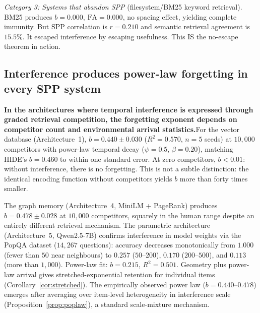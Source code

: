 \documentclass[11pt]{article}
\begin{document}
\textit{Category 3: Systems that abandon SPP} (filesystem/BM25 keyword retrieval). BM25 produces $b = 0.000$, $\text{FA} = 0.000$, no spacing effect, yielding complete immunity. But SPP correlation is $r = 0.210$ and semantic retrieval agreement is $15.5\%$. It escaped interference by escaping usefulness. This IS the no-escape theorem in action.

\subsection*{Interference produces power-law forgetting in every SPP system}

\noindent\textbf{In the architectures where temporal interference is expressed through graded retrieval competition, the forgetting exponent depends on competitor count and environmental arrival statistics.}\quad For the vector database (Architecture~1), $b = 0.440 \pm 0.030$ ($R^2 = 0.570$, $n = 5$ seeds) at $10{,}000$ competitors with power-law temporal decay ($\psi = 0.5$, $\beta = 0.20$), matching HIDE's $b = 0.460$ to within one standard error. At zero competitors, $b < 0.01$: without interference, there is no forgetting. This is not a subtle distinction: the identical encoding function without competitors yields $b$ more than forty times smaller.

The graph memory (Architecture~4, MiniLM + PageRank) produces $b = 0.478 \pm 0.028$ at $10{,}000$ competitors, squarely in the human range despite an entirely different retrieval mechanism. The parametric architecture (Architecture~5, Qwen2.5-7B) confirms interference in model weights via the PopQA dataset ($14{,}267$ questions): accuracy decreases monotonically from $1.000$ (fewer than $50$ near neighbours) to $0.257$ ($50$--$200$), $0.170$ ($200$--$500$), and $0.113$ (more than $1{,}000$). Power-law fit: $b = 0.215$, $R^2 = 0.501$. Geometry plus power-law arrival gives stretched-exponential retention for individual items (Corollary~\ref{cor:stretched}). The empirically observed power law ($b = 0.440$--$0.478$) emerges after averaging over item-level heterogeneity in interference scale (Proposition~\ref{prop:poplaw}), a standard scale-mixture mechanism.
\end{document}
